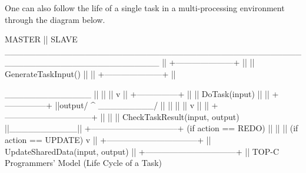 One can also follow the life of  a  single  task  in  a  multi-processing
environment through the diagram below.

\begintt
               MASTER               ||               SLAVE
_________________________________________________________________________
                                    ||  
      +---------------------+       ||
      || GenerateTaskInput() ||       ||
      +---------------------+       ||
                             
                              \______________
                                    ||        ||
                                    ||        v
                                    ||       +---------------+
                                    ||       || DoTask(input) ||
                                    ||       +---------------+
                                    ||output/  ^
                                 _________/   ||
                                ||   ||         ||
                                v   ||         ||
 +--------------------------------+ ||         ||
 || CheckTaskResult(input, output) ||___________||
 +--------------------------------+ (if action == REDO)
                         ||          ||
                         || (if action == UPDATE)
                         v          ||
                    +---------------------------------+
                    || UpdateSharedData(input, output) ||
                    +---------------------------------+
                                    ||
                         TOP-C Programmers' Model
                          (Life Cycle of a Task)
 
